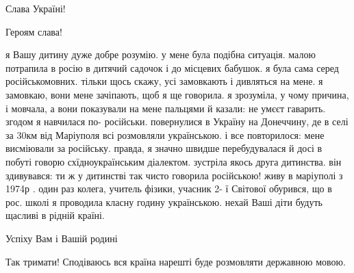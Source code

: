 \begin{itemize}
Слава Україні!

 
Героям слава!

 

я Вашу дитину дуже добре розумію. у мене була подібна ситуація. малою потрапила
в росію в дитячий садочок і до місцевих бабушок. я була сама серед
російськомовних. тільки щось скажу, усі замовкають і дивляться на мене. я
замовкаю, вони мене зачіпають, щоб я ще говорила. я зрозуміла, у чому причина,
і мовчала, а вони показували на мене пальцями й казали: не умєєт гаварить.
згодом я навчилася по- російськи. повернулися в Україну на Донеччину, де в селі
за 30км від Маріуполя всі розмовляли українською. і все повторилося: мене
висміювали за російську. правда, я значно швидше перебудувалася й досі в побуті
говорю схїдноукраїнським діалектом. зустріла якось друга дитинства. він
здивувався: ти ж у дитинстві так чисто говорила російською! живу в маріуполі з
1974р . один раз колега, учитель фізики, учасник 2- ї Світової обурився, що в
рос. школі я проводила класну годину українською. нехай Ваші діти будуть
щасливі в рідній країні.

 
Успіху Вам і Вашій родині

 
Так тримати!
Сподіваюсь вся країна нарешті буде розмовляти державною мовою.

 


\end{itemize}
